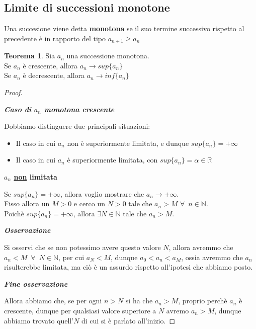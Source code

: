 \documentclass{article}
\theoremstyle{definition}
\newtheorem{thm}{Teorema}
\begin{document}
\subsection{Limite di successioni monotone}
Una succesione viene detta \textbf{monotona} se il suo termine successivo rispetto al precedente è in rapporto del tipo $a_{n+1} \geqslant a_n$
\begin{thm}
    Sia $a_n$ una successione monotona.
    \\
    Se $a_n$ è crescente, allora $a_n \longrightarrow sup\{a_n\}$
    \\
    Se $a_n$ è decrescente, allora $a_n \longrightarrow inf\{a_n\}$
\end{thm}
\begin{proof}
    \begin{center}
        \textbf{\textit{Caso di $a_n$ monotona crescente}}
    \end{center}
    Dobbiamo distinguere due principali situazioni:
    \begin{itemize}
        \item Il caso in cui $a_n$ non è superiormente limitata, e dunque $sup\{a_n\}=+\infty$
        \item Il caso in cui $a_n$ è superiormente limitata, con $sup\{a_n\}=\alpha \in \mathbb{R}$
    \end{itemize}
    \begin{center}
        \textbf{\textit{$a_n$} \underline{non} limitata}
    \end{center}
    Se $sup\{a_n\}=+\infty$, allora voglio mostrare che $a_n \to +\infty$.
    \\
    Fisso allora un $M>0$ e cerco un $N>0$ tale che $a_n>M$ $\forall \,\,\, n \in \mathbb{N}$.
    \\
    Poichè $sup\{a_n\}=+\infty$, allora $\exists$$N \in \mathbb{N}$ tale che $a_n>M$.
    \\
    \begin{center}
        \textbf{\textit{Osservazione}}
    \end{center}
    Si osservi che se non potessimo avere questo valore $N$, allora avremmo che $a_n<M \,\,\, \forall \,\,\, N \in \mathbb{N}$, per cui $a_N<M$, dunque $a_0<a_n<a_M$, ossia avremmo che $a_n$ risulterebbe limitata, ma ciò è un assurdo rispetto all'ipotesi che abbiamo posto.
    \\
    \begin{center}
        \textbf{\textit{Fine osservazione}}
    \end{center}
    Allora abbiamo che, se per ogni $n>N$ si ha che $a_n>M$, proprio perchè $a_n$ è crescente, dunque per qualsiasi valore superiore a $N$ avremo $a_n>M$, dunque abbiamo trovato quell'$N$ di cui si è parlato all'inizio.


\end{proof}
\end{document}
